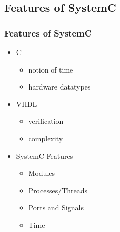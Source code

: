 \documentclass{beamer}
\begin{document}
\subsection{Features of SystemC}
\begin{frame} \frametitle{Features of SystemC} 
  \begin{itemize}
   \item C
    \begin{itemize}
      \item{notion of time}
      \item{hardware datatypes}
    \end{itemize}
   \item VHDL
    \begin{itemize}
      \item{verification}
      \item{complexity}
    \end{itemize}
   \item SystemC Features
    \begin{itemize}
      \item{Modules}
      \item{Processes/Threads}    
      \item{Ports and Signals}
      \item{Time}
    \end{itemize}
  \end{itemize}
\end{frame}
\end{document}
